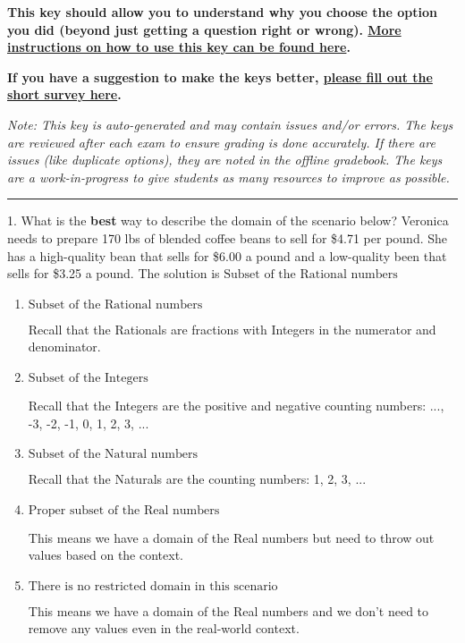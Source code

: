 \documentclass{extbook}[14pt]
\begin{document}
\textbf{This key should allow you to understand why you choose the option you did (beyond just getting a question right or wrong). \href{https://xronos.clas.ufl.edu/mac1105spring2020/courseDescriptionAndMisc/Exams/LearningFromResults}{More instructions on how to use this key can be found here}.}

\textbf{If you have a suggestion to make the keys better, \href{https://forms.gle/CZkbZmPbC9XALEE88}{please fill out the short survey here}.}

\textit{Note: This key is auto-generated and may contain issues and/or errors. The keys are reviewed after each exam to ensure grading is done accurately. If there are issues (like duplicate options), they are noted in the offline gradebook. The keys are a work-in-progress to give students as many resources to improve as possible.}

\rule{\textwidth}{0.4pt}

1. What is the \textbf{best} way to describe the domain of the scenario below?
Veronica needs to prepare 170 lbs of blended coffee beans to sell for \$4.71 per pound. She has a high-quality bean that sells for \$6.00 a pound and a low-quality been that sells for \$3.25 a pound. 
The solution is $ \text{Subset of the Rational numbers} $ 

\begin{enumerate}[label=\Alph*.] 
\item $ \text{Subset of the Rational numbers} $ 

 Recall that the Rationals are fractions with Integers in the numerator and denominator. 
\item $ \text{Subset of the Integers} $ 

 Recall that the Integers are the positive and negative counting numbers: ..., -3, -2, -1, 0, 1, 2, 3, ...  
\item $ \text{Subset of the Natural numbers} $ 

 Recall that the Naturals are the counting numbers: 1, 2, 3, ... 
\item $ \text{Proper subset of the Real numbers} $ 

 This means we have a domain of the Real numbers but need to throw out values based on the context. 
\item $ \text{There is no restricted domain in this scenario} $ 

 This means we have a domain of the Real numbers and we don't need to remove any values even in the real-world context. 
\end{enumerate} 
 
\end{document}

